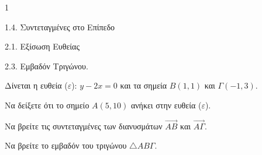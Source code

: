 \begin{ylh}{1}
    \item 1.4. Συντεταγμένες στο Επίπεδο
    \item 2.1. Εξίσωση Ευθείας
    \item 2.3. Εμβαδόν Τριγώνου.
\end{ylh}
Δίνεται η ευθεία ($\varepsilon$): $y - 2x = 0$ και τα σημεία $B(1,1)$ και $\Gamma(-1,3)$.
\begin{alist}
\item Να δείξετε ότι το σημείο $A(5,10)$ ανήκει στην ευθεία ($\varepsilon$). 
\item Να βρείτε τις συντεταγμένες των διανυσμάτων $\overrightarrow{AB}$ και $\overrightarrow{A\Gamma}$. 
\item Να βρείτε το εμβαδόν του τριγώνου $\triangle AB\Gamma$. 
\end{alist}